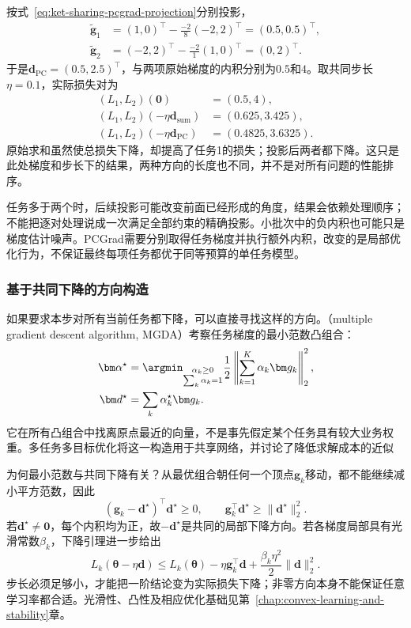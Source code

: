 按式~\eqref{eq:ket-sharing-pcgrad-projection}分别投影，
\begin{align}
  \widetilde{\bm g}_1
    &=(1,0)^{\top}-\frac{-2}{8}(-2,2)^{\top}
      =(0.5,0.5)^{\top},
  \nonumber\\
  \widetilde{\bm g}_2
    &=(-2,2)^{\top}-\frac{-2}{1}(1,0)^{\top}
      =(0,2)^{\top}.
\end{align}
于是$\bm d_{\mathrm{PC}}=(0.5,2.5)^{\top}$，与两项原始梯度的内积分别为$0.5$和$4$。取共同步长$\eta=0.1$，实际损失对为
\begin{align}
  (L_1,L_2)(\bm0)&=(0.5,4),
  \nonumber\\
  (L_1,L_2)(-\eta\bm d_{\mathrm{sum}})
    &=(0.625,3.425),
  \nonumber\\
  (L_1,L_2)(-\eta\bm d_{\mathrm{PC}})
    &=(0.4825,3.6325).
  \label{eq:ket-sharing-pcgrad-numbers}
\end{align}
原始求和虽然使总损失下降，却提高了任务1的损失；投影后两者都下降。这只是此处梯度和步长下的结果，两种方向的长度也不同，并不是对所有问题的性能排序。

任务多于两个时，后续投影可能改变前面已经形成的角度，结果会依赖处理顺序；不能把逐对处理说成一次满足全部约束的精确投影。小批次中的负内积也可能只是梯度估计噪声。PCGrad需要分别取得任务梯度并执行额外内积，改变的是局部优化行为，不保证最终每项任务都优于同等预算的单任务模型。

\subsubsection{基于共同下降的方向构造}
\label{sec:ket-sharing-mgda}

如果要求本步对所有当前任务都下降，可以直接寻找这样的方向。（multiple gradient descent algorithm, MGDA）考察任务梯度的最小范数凸组合：
\begin{align}
  \bm\alpha^\star
  &=\argmin_{\substack{\alpha_k\geq0\\\sum_k\alpha_k=1}}
  \frac12\left\|\sum_{k=1}^{K}\alpha_k\bm g_k\right\|_2^2,
  \nonumber\\
  \bm d^\star&=\sum_k\alpha_k^\star\bm g_k.
  \label{eq:ket-sharing-mgda}
\end{align}
它在所有凸组合中找离原点最近的向量，不是事先假定某个任务具有较大业务权重。多任务多目标优化将这一构造用于共享网络，并讨论了降低求解成本的近似

为何最小范数与共同下降有关？从最优组合朝任何一个顶点$\bm g_k$移动，都不能继续减小平方范数，因此
\begin{equation}
  (\bm g_k-\bm d^\star)^{\top}\bm d^\star\geq0,
  \qquad
  \bm g_k^{\top}\bm d^\star
  \geq\|\bm d^\star\|_2^2.
  \label{eq:ket-sharing-common-descent}
\end{equation}
若$\bm d^\star\ne\bm0$，每个内积均为正，故$-\bm d^\star$是共同的局部下降方向。若各梯度局部具有光滑常数$\beta_k$，下降引理进一步给出
\begin{equation}
  L_k(\bm\theta-\eta\bm d)
  \leq L_k(\bm\theta)
  -\eta\bm g_k^{\top}\bm d
  +\frac{\beta_k\eta^2}{2}\|\bm d\|_2^2.
\end{equation}
步长必须足够小，才能把一阶结论变为实际损失下降；非零方向本身不能保证任意学习率都合适。光滑性、凸性及相应优化基础见第~\ref{chap:convex-learning-and-stability}章。

